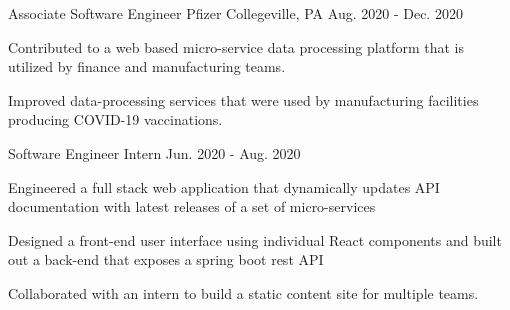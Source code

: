 \begin{cventries}
  \cventry
    {Associate Software Engineer} %
    {Pfizer} %
    {Collegeville, PA} %
    {Aug. 2020 - Dec. 2020} %
    {
      \begin{cvitems} %
        \item {Contributed to a web based micro-service data processing platform that is utilized by finance and manufacturing teams.}
        \item {Improved data-processing services that were used by manufacturing facilities producing COVID-19 vaccinations.}
      \end{cvitems}
    }

  \cventry
    {Software Engineer Intern} %
    {} %
    {} %
    {Jun. 2020 - Aug. 2020} %
    {
      \begin{cvitems} %
        \item {Engineered a full stack web application that dynamically updates API documentation with latest releases of a set of micro-services}
        \item {Designed a front-end user interface using individual React components and built out a back-end that exposes a spring boot rest API}
        \item {Collaborated with an intern to build a static content site for multiple teams.}
      \end{cvitems}
    }

\end{cventries}
